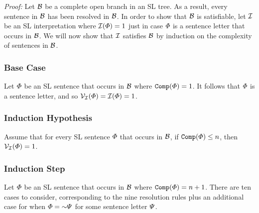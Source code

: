 \label{HintikkaLemma}

\textit{Proof:}
Let $\mathcal{B}$ be a complete open branch in an SL tree. 
As a result, every sentence in $\mathcal{B}$ has been resolved in $\mathcal{B}$. 
In order to show that $\mathcal{B}$ is satisfiable, let $\mathcal{I}$ be an SL interpretation where $\mathcal{I}(\varPhi)=1$ just in case $\varPhi$ is a sentence letter that occurs in $\mathcal{B}$.
We will now show that $\mathcal{I}$ satisfies $\mathcal{B}$ by induction on the complexity of sentences in $\mathcal{B}$.



\subsubsection{Base Case}

Let $\varPhi$ be an SL sentence that occurs in $\mathcal{B}$ where $\texttt{Comp}(\varPhi)=1$.
It follows that $\varPhi$ is a sentence letter, and so $\mathcal{V}_{\mathcal{I}}(\varPhi)=\mathcal{I}(\varPhi)=1$.


\subsubsection{Induction Hypothesis}

Assume that for every SL sentence $\varPhi$ that occurs in $\mathcal{B}$, if $\texttt{Comp}(\varPhi)\leq n$, then $\mathcal{V}_{\mathcal{I}}(\varPhi)=1$. 


\subsubsection{Induction Step}

Let $\varPhi$ be an SL sentence that occurs in $\mathcal{B}$ where $\texttt{Comp}(\varPhi)=n+1$.
There are ten cases to consider, corresponding to the nine resolution rules plus an additional case for when $\metaA=\enot\metaB$ for some sentence letter $\varPsi$. 

